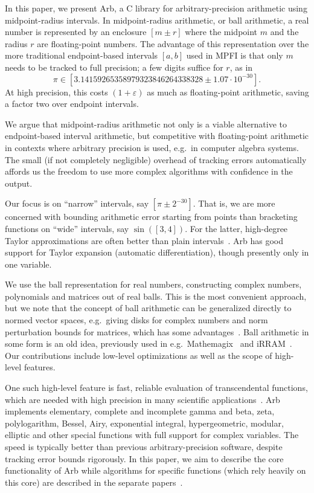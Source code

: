 \documentclass[10pt,journal,compsoc,cspaper]{IEEEtran}
\begin{document}
In this paper, we present Arb, a C library for arbitrary-precision
arithmetic using midpoint-radius intervals.
In midpoint-radius arithmetic, or ball arithmetic, a real number
is represented by an enclosure $[m \pm r]$ where the midpoint $m$
and the radius $r$ are floating-point numbers. The advantage
of this representation over the more traditional endpoint-based
intervals $[a,b]$ used in MPFI is that only $m$ needs to be tracked
to full precision; a few digits suffice for $r$, as in
$$\pi \in [3.14159265358979323846264338328 \pm 1.07 \cdot 10^{-30}].$$
At high precision, this costs $(1+\varepsilon)$ as much as
floating-point arithmetic, saving a factor two over endpoint intervals.

We argue that midpoint-radius arithmetic not only is a viable alternative to
endpoint-based interval arithmetic,
but competitive with floating-point arithmetic
in contexts
where arbitrary precision is used,
e.g.\ in computer algebra systems.
The small (if not completely negligible) overhead of tracking errors automatically
affords us the freedom to use more complex algorithms with
confidence in the output.

Our focus is on ``narrow'' intervals, say $[\pi \pm 2^{-30}]$.
That is, we are more concerned with bounding arithmetic error starting
from points than bracketing functions on ``wide'' intervals, say $\sin([3,4])$.
For the latter, high-degree Taylor approximations
are often better than plain intervals~\cite{makino2003taylor}.
Arb has good support for Taylor expansion (automatic
differentiation), though presently only in one variable.

We use the ball representation for real numbers,
constructing complex numbers,
polynomials and matrices out of real balls.
This is the most convenient approach, but we note
that the concept of ball arithmetic can
be generalized directly to normed vector spaces,
e.g.\ giving disks for complex numbers and norm perturbation
bounds for matrices, which has some advantages~\cite{vdH:ball}.
Ball arithmetic in some form
is an old idea, previously used in e.g.\
Mathemagix~\cite{mathemagix,lecerf2010mathemagix} and iRRAM~\cite{Muller2001}.
Our contributions include low-level optimizations as well as
the scope of high-level features.

One such high-level feature is fast, reliable evaluation of
transcendental functions, which are needed
with high precision in many scientific applications~\cite{bailey2015high}.
Arb implements elementary, complete
and incomplete gamma and beta, zeta, polylogarithm,
Bessel, Airy, exponential integral,
hypergeometric, modular, elliptic and other special functions
with full support for complex variables.
The speed is typically better than
previous arbitrary-precision software, despite
tracking error bounds rigorously.
In this paper, we aim to describe the core functionality of Arb
while algorithms for specific functions
(which rely heavily on this core) are described
in the separate papers~\cite{Johansson2015elementary,Johansson2014hurwitz,Johansson2016hypergeometric}.
\end{document}
